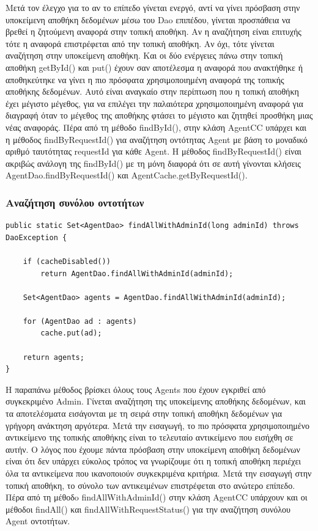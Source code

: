 \documentclass[a4paper,11pt]{article}
\begin{document}
\begin{sloppypar}
Μετά τον έλεγχο για το αν το επίπεδο γίνεται ενεργό, αντί να γίνει πρόσβαση στην υποκείμενη αποθήκη δεδομένων μέσω του Dao επιπέδου, γίνεται προσπάθεια να βρεθεί η ζητούμενη αναφορά στην τοπική αποθήκη. Αν η αναζήτηση είναι επιτυχής τότε η αναφορά επιστρέφεται από την τοπική αποθήκη. Αν όχι, τότε γίνεται αναζήτηση στην υποκείμενη αποθήκη. Και οι δύο ενέργειες πάνω στην τοπική αποθήκη getById() και put() έχουν σαν αποτέλεσμα η αναφορά που ανακτήθηκε ή αποθηκεύτηκε να γίνει η πιο πρόσφατα χρησιμοποιημένη αναφορά της τοπικής αποθήκης δεδομένων. Αυτό είναι αναγκαίο στην περίπτωση που η τοπική αποθήκη έχει μέγιστο μέγεθος, για να επιλέγει την παλαιότερα χρησιμοποιημένη αναφορά για διαγραφή όταν το μέγεθος της αποθήκης φτάσει το μέγιστο και ζητηθεί προσθήκη μιας νέας αναφοράς. Πέρα από τη μέθοδο findById(), στην κλάση AgentCC υπάρχει και η μέθοδος findByRequestId() για αναζήτηση οντότητας Agent με βάση το μοναδικό αριθμό ταυτότητας requestId για κάθε Agent. Η μέθοδος findByRequestId() είναι ακριβώς ανάλογη της findById() με τη μόνη διαφορά ότι σε αυτή γίνονται κλήσεις AgentDao.findByRequestId() και AgentCache.getByRequestId().

\newpage


\subsubsection{Αναζήτηση συνόλου οντοτήτων}

\begin{lstlisting}
public static Set<AgentDao> findAllWithAdminId(long adminId) throws DaoException {

    if (cacheDisabled())
        return AgentDao.findAllWithAdminId(adminId);

    Set<AgentDao> agents = AgentDao.findAllWithAdminId(adminId);

    for (AgentDao ad : agents)
        cache.put(ad);

    return agents;
}
\end{lstlisting}

Η παραπάνω μέθοδος βρίσκει όλους τους Agents που έχουν εγκριθεί από συγκεκριμένο Admin. Γίνεται αναζήτηση της υποκείμενης αποθήκης δεδομένων, και τα αποτελέσματα εισάγονται με τη σειρά στην τοπική αποθήκη δεδομένων για γρήγορη ανάκτηση αργότερα. Μετά την εισαγωγή, το πιο πρόσφατα χρησιμοποιημένο αντικείμενο της τοπικής αποθήκης είναι το τελευταίο αντικείμενο που εισήχθη σε αυτήν. Ο λόγος που έχουμε πάντα πρόσβαση στην υποκείμενη αποθήκη δεδομένων είναι ότι δεν υπάρχει εύκολος τρόπος να γνωρίζουμε ότι η τοπική αποθήκη περιέχει όλα τα αντικείμενα που ικανοποιούν συγκεκριμένα κριτήρια. Μετά την εισαγωγή στην τοπική αποθήκη, το σύνολο των αντικειμένων επιστρέφεται στο ανώτερο επίπεδο. Πέρα από τη μέθοδo findAllWithAdminId() στην κλάση AgentCC υπάρχουν και οι μέθοδοι findAll() και findAllWithRequestStatus() για την αναζήτηση συνόλου Agent οντοτήτων.


\end{sloppypar}
\end{document}
